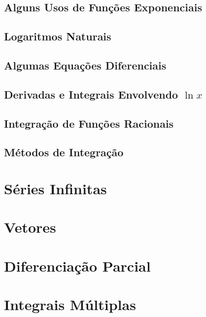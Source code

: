 \documentclass{svmono}
\begin{document}
\section{Alguns Usos de Funções Exponenciais}
\label{sec:useexp}

\section{Logaritmos Naturais}
\label{sec:natlog}

\section{Algumas Equações Diferenciais}
\label{sec:diffeq}

\section{Derivadas e Integrais Envolvendo $\ln x$}
\label{sec:derivln}

\section{Integração de Funções Racionais}
\label{sec:intratfunc}

\section{Métodos de Integração}
\label{sec:methodint}

\chapterproblems

\chapter{Séries Infinitas}
\label{chp:infseries}

\chapterproblems

\chapter{Vetores}
\label{chp:vectors}

\chapterproblems

\chapter{Diferenciação Parcial}
\label{chp:partialdiff}

\chapterproblems

\chapter{Integrais Múltiplas}
\label{chp:multipleint}
\end{document}
